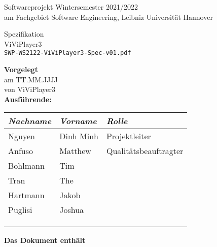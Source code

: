 \documentclass[a4paper, 12pt]{article}
\begin{document}
	\thispagestyle{empty} %
	\begin{center}
		{\Huge Softwareprojekt Wintersemester 2021/2022}\\[.35cm]
		{\large am Fachgebiet Software Engineering, Leibniz Universität Hannover}\\[.1cm]
	\end{center}
	\begin{center}
	\colorbox{lightlightgray}{
		\begin{minipage}{\linewidth}
			\begin{center}
				\vspace{0.2cm}
				{\Huge Spezifikation}\\[.1cm]
				{\Huge ViViPlayer3}\\[.3cm]
				\texttt{SWP-WS2122-ViViPlayer3-Spec-v01.pdf}
				\vspace{0.2cm}
			\end{center}
		\end{minipage}
	}
	\end{center}
	\textbf{Vorgelegt}\\
		\hspace*{1cm}am TT.MM.JJJJ \\
		\hspace*{1cm}von ViViPlayer3\\[0.2cm]
	\textbf{Ausführende:}
		\begin{center}
			\begin{tabular}{|l|l|l|}
				\hline
				\textit{Nachname} 				& \textit{Vorname} 	& \textit{Rolle} \\ \hline\hline
				Nguyen							& Dinh Minh				& Projektleiter \\ \hline
				Anfuso							& Matthew				& Qualitätsbeauftragter \\ \hline
				Bohlmann							& Tim			& \\ \hline
				Tran							& The			& \\ \hline
				Hartmann							& Jakob			& \\ \hline
				Puglisi							& Joshua			& \\ \hline
											& 			& \\ \hline
											& 				& \\ \hline
											& 			& \\ \hline
			\end{tabular}
		\end{center}
		\vspace{0.3cm}
	\textbf{Das Dokument enthält}\\[0.1cm]
\end{document}
